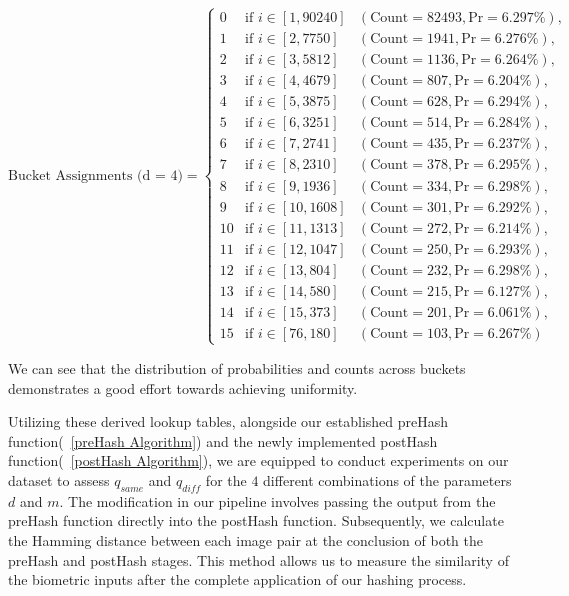 \renewcommand{\arraystretch}{1.25}
\[
\text{Bucket Assignments (d = 4)} = \left\{
\begin{array}{lll}
    0 & \text{if } i \in [1, 90240] & (\text{Count} = 82493, \text{Pr} = 6.297\%), \\
    1 & \text{if } i \in [2, 7750] & (\text{Count} = 1941, \text{Pr} = 6.276\%), \\
    2 & \text{if } i \in [3, 5812] & (\text{Count} = 1136, \text{Pr} = 6.264\%), \\
    3 & \text{if } i \in [4, 4679] & (\text{Count} = 807, \text{Pr} = 6.204\%), \\
    4 & \text{if } i \in [5, 3875] & (\text{Count} = 628, \text{Pr} = 6.294\%), \\
    5 & \text{if } i \in [6, 3251] & (\text{Count} = 514, \text{Pr} = 6.284\%), \\
    6 & \text{if } i \in [7, 2741] & (\text{Count} = 435, \text{Pr} = 6.237\%), \\
    7 & \text{if } i \in [8, 2310] & (\text{Count} = 378, \text{Pr} = 6.295\%), \\
    8 & \text{if } i \in [9, 1936] & (\text{Count} = 334, \text{Pr} = 6.298\%), \\
    9 & \text{if } i \in [10, 1608] & (\text{Count} = 301, \text{Pr} = 6.292\%), \\
    10 & \text{if } i \in [11, 1313] & (\text{Count} = 272, \text{Pr} = 6.214\%), \\
    11 & \text{if } i \in [12, 1047] & (\text{Count} = 250, \text{Pr} = 6.293\%), \\
    12 & \text{if } i \in [13, 804] & (\text{Count} = 232, \text{Pr} = 6.298\%), \\
    13 & \text{if } i \in [14, 580] & (\text{Count} = 215, \text{Pr} = 6.127\%), \\
    14 & \text{if } i \in [15, 373] & (\text{Count} = 201, \text{Pr} = 6.061\%), \\
    15 & \text{if } i \in [76, 180] & (\text{Count} = 103, \text{Pr} = 6.267\%)
\end{array}
\right.
\]


We can see that the distribution of probabilities and counts across buckets demonstrates a good effort towards achieving uniformity.

Utilizing these derived lookup tables, alongside our established preHash function(~\ref{preHash Algorithm}) and the newly implemented postHash function(~\ref{postHash Algorithm}), we are equipped to conduct experiments on our dataset to assess \(q_{same}\) and \(q_{diff}\) for the \(4\) different combinations of the parameters \(d\) and \(m\). The modification in our pipeline involves passing the output from the preHash function directly into the postHash function. Subsequently, we calculate the Hamming distance between each image pair at the conclusion of both the preHash and postHash stages. This method allows us to measure the similarity of the biometric inputs after the complete application of our hashing process.

